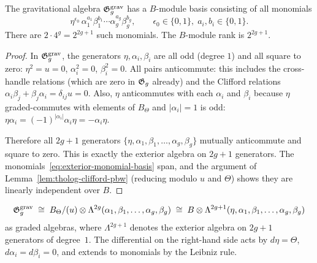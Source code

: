 \begin{proposition}
The gravitational algebra $\mathfrak{G}_g^{\mathrm{grav}}$
has a $B$-module basis consisting of all monomials
\begin{equation}%
\eta^{\epsilon_0}\,
\alpha_1^{a_1}\beta_1^{b_1}
\cdots
\alpha_g^{a_g}\beta_g^{b_g},
\qquad
\epsilon_0 \in \{0,1\},\;
a_i, b_i \in \{0,1\}.
\end{equation}
There are $2 \cdot 4^g = 2^{2g+1}$ such monomials.
The $B$-module rank is $2^{2g+1}$.
\end{proposition}

\begin{proof}
In $\mathfrak{G}_g^{\mathrm{grav}}$, the generators $\eta, \alpha_i, \beta_i$
are all odd (degree $1$) and all square to zero:
$\eta^2 = u = 0$, $\alpha_i^2 = 0$, $\beta_i^2 = 0$.
All pairs anticommute: this includes the
cross-handle relations (which are zero in $\mathfrak{G}_g$ already)
and the Clifford relations
$\alpha_i\beta_j + \beta_j\alpha_i = \delta_{ij}u = 0$.
Also, $\eta$ anticommutes with each $\alpha_i$ and $\beta_i$
because $\eta$ graded-commutes with elements of $B_\Theta$
and $|\alpha_i| = 1$ is odd:
$\eta\alpha_i = (-1)^{|\alpha_i|}\alpha_i\eta = -\alpha_i\eta$.

Therefore all $2g + 1$ generators $\{\eta, \alpha_1, \beta_1,
\dots, \alpha_g, \beta_g\}$ mutually anticommute and square to
zero.
This is exactly the exterior algebra on $2g+1$ generators.
The monomials~\eqref{eq:exterior-monomial-basis} span, and
the argument of Lemma~\ref{lem:tholog-clifford-pbw} (reducing
modulo $u$ and $\Theta$) shows they are linearly independent
over $B$.
\end{proof}

\begin{corollary}
\label{cor:tholog-gravitational-exterior}
\[
\mathfrak{G}_g^{\mathrm{grav}}
\;\cong\;
B_\Theta/(u) \otimes \Lambda^{2g}(\alpha_1,\beta_1,\dots,\alpha_g,\beta_g)
\;\cong\;
B \otimes \Lambda^{2g+1}(\eta,\alpha_1,\beta_1,\dots,\alpha_g,\beta_g)
\]
as graded algebras, where $\Lambda^{2g+1}$ denotes the exterior
algebra on $2g + 1$ generators of degree~$1$.
The differential on the right-hand side acts by
$d\eta = \Theta$, $d\alpha_i = d\beta_i = 0$, and extends
to monomials by the Leibniz rule.
\end{corollary}

